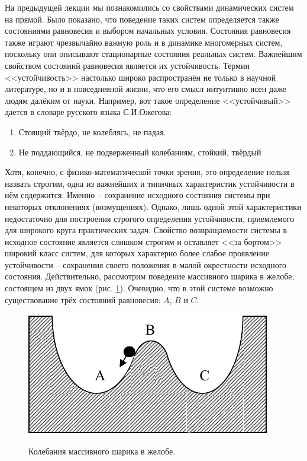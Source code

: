 \graphicspath{{fig/lect3/}}
На предыдущей лекции мы познакомились со свойствами динамических систем на прямой. Было показано, что поведение таких систем определяется также состояниями равновесия и выбором начальных условия. Состояния равновесия также играют чрезвычайно важную роль и в динамике многомерных систем, поскольку они описывают стационарные состояния реальных систем. Важнейшим свойством состояний равновесия является их устойчивость. Термин <<устойчивость>> настолько широко распространён не только в научной литературе, но и в повседневной жизни, что его смысл интуитивно ясен даже людям далёким от науки. Например, вот такое определение <<устойчивый>> дается в словаре русского языка С.И.Ожегова:
\begin{enumerate}
    \item Стоящий твёрдо, не колеблясь, не падая.
    \item Не поддающийся, не подверженный колебаниям, стойкий, твёрдый
\end{enumerate}
Хотя, конечно, с физико-математической точки зрения, это определение нельзя назвать строгим,  одна из важнейших и типичных характеристик устойчивости в нём содержится. Именно -- сохранение исходного состояния системы при некоторых отклонениях (возмущениях). Однако, лишь одной этой характеристики недостаточно для построения строгого определения устойчивости, приемлемого для широкого круга практических задач. Свойство возвращаемости системы в исходное состояние является слишком строгим и оставляет <<за бортом>> широкий класс систем, для которых характерно более слабое проявление устойчивости -- сохранения своего положения в малой окрестности исходного состояния. Действительно, рассмотрим поведение массивного шарика в желобе, состоящем из двух ямок (рис. \ref{fig:3.1}). Очевидно, что в этой системе возможно  существование трёх состояний   равновесия:
$A$, $B$ и $C$. 
\begin{figure}[h!]
    \centering
    \includegraphics[]{fig/lect3/1}
    \label{fig:3.1}
    \caption{Колебания массивного шарика в желобе. }
\end{figure}

